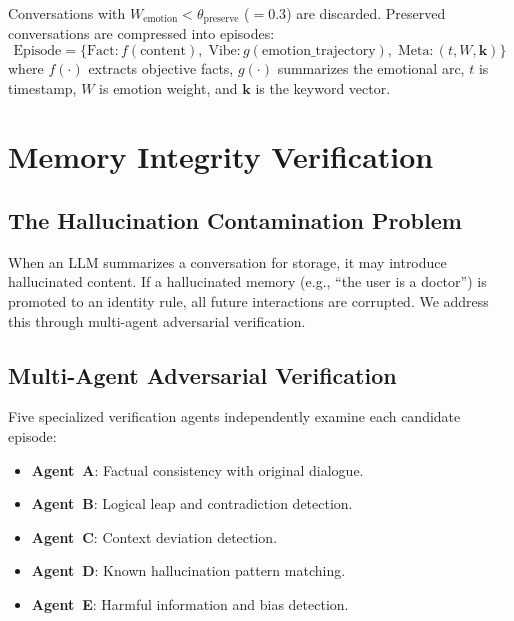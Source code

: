\documentclass[11pt,a4paper]{article}
\begin{document}
Conversations with $W_{\text{emotion}} < \theta_{\text{preserve}}$ ($= 0.3$) are discarded. Preserved conversations are compressed into episodes:
\begin{equation}
  \text{Episode} = \bigl\{
    \text{Fact}: f(\text{content}),\;
    \text{Vibe}: g(\text{emotion\_trajectory}),\;
    \text{Meta}: (t, W, \mathbf{k})
  \bigr\}
\end{equation}
where $f(\cdot)$ extracts objective facts, $g(\cdot)$ summarizes the emotional arc, $t$ is timestamp, $W$ is emotion weight, and $\mathbf{k}$ is the keyword vector.

\section{Memory Integrity Verification}

\subsection{The Hallucination Contamination Problem}

When an LLM summarizes a conversation for storage, it may introduce hallucinated content. If a hallucinated memory (e.g., ``the user is a doctor'') is promoted to an identity rule, all future interactions are corrupted. We address this through multi-agent adversarial verification.

\subsection{Multi-Agent Adversarial Verification}

Five specialized verification agents independently examine each candidate episode:

\begin{itemize}[itemsep=2pt]
  \item \textbf{Agent~A}: Factual consistency with original dialogue.
  \item \textbf{Agent~B}: Logical leap and contradiction detection.
  \item \textbf{Agent~C}: Context deviation detection.
  \item \textbf{Agent~D}: Known hallucination pattern matching.
  \item \textbf{Agent~E}: Harmful information and bias detection.
\end{itemize}
\end{document}
